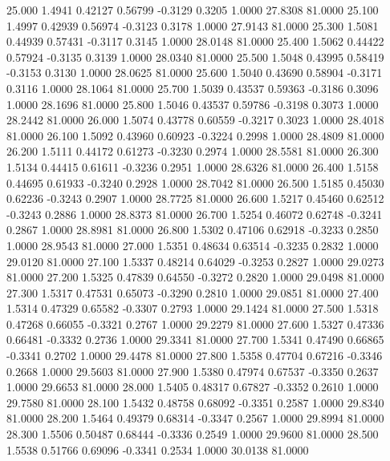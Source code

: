   25.000   1.4941   0.42127   0.56799  -0.3129   0.3205   1.0000  27.8308  81.0000
  25.100   1.4997   0.42939   0.56974  -0.3123   0.3178   1.0000  27.9143  81.0000
  25.300   1.5081   0.44939   0.57431  -0.3117   0.3145   1.0000  28.0148  81.0000
  25.400   1.5062   0.44422   0.57924  -0.3135   0.3139   1.0000  28.0340  81.0000
  25.500   1.5048   0.43995   0.58419  -0.3153   0.3130   1.0000  28.0625  81.0000
  25.600   1.5040   0.43690   0.58904  -0.3171   0.3116   1.0000  28.1064  81.0000
  25.700   1.5039   0.43537   0.59363  -0.3186   0.3096   1.0000  28.1696  81.0000
  25.800   1.5046   0.43537   0.59786  -0.3198   0.3073   1.0000  28.2442  81.0000
  26.000   1.5074   0.43778   0.60559  -0.3217   0.3023   1.0000  28.4018  81.0000
  26.100   1.5092   0.43960   0.60923  -0.3224   0.2998   1.0000  28.4809  81.0000
  26.200   1.5111   0.44172   0.61273  -0.3230   0.2974   1.0000  28.5581  81.0000
  26.300   1.5134   0.44415   0.61611  -0.3236   0.2951   1.0000  28.6326  81.0000
  26.400   1.5158   0.44695   0.61933  -0.3240   0.2928   1.0000  28.7042  81.0000
  26.500   1.5185   0.45030   0.62236  -0.3243   0.2907   1.0000  28.7725  81.0000
  26.600   1.5217   0.45460   0.62512  -0.3243   0.2886   1.0000  28.8373  81.0000
  26.700   1.5254   0.46072   0.62748  -0.3241   0.2867   1.0000  28.8981  81.0000
  26.800   1.5302   0.47106   0.62918  -0.3233   0.2850   1.0000  28.9543  81.0000
  27.000   1.5351   0.48634   0.63514  -0.3235   0.2832   1.0000  29.0120  81.0000
  27.100   1.5337   0.48214   0.64029  -0.3253   0.2827   1.0000  29.0273  81.0000
  27.200   1.5325   0.47839   0.64550  -0.3272   0.2820   1.0000  29.0498  81.0000
  27.300   1.5317   0.47531   0.65073  -0.3290   0.2810   1.0000  29.0851  81.0000
  27.400   1.5314   0.47329   0.65582  -0.3307   0.2793   1.0000  29.1424  81.0000
  27.500   1.5318   0.47268   0.66055  -0.3321   0.2767   1.0000  29.2279  81.0000
  27.600   1.5327   0.47336   0.66481  -0.3332   0.2736   1.0000  29.3341  81.0000
  27.700   1.5341   0.47490   0.66865  -0.3341   0.2702   1.0000  29.4478  81.0000
  27.800   1.5358   0.47704   0.67216  -0.3346   0.2668   1.0000  29.5603  81.0000
  27.900   1.5380   0.47974   0.67537  -0.3350   0.2637   1.0000  29.6653  81.0000
  28.000   1.5405   0.48317   0.67827  -0.3352   0.2610   1.0000  29.7580  81.0000
  28.100   1.5432   0.48758   0.68092  -0.3351   0.2587   1.0000  29.8340  81.0000
  28.200   1.5464   0.49379   0.68314  -0.3347   0.2567   1.0000  29.8994  81.0000
  28.300   1.5506   0.50487   0.68444  -0.3336   0.2549   1.0000  29.9600  81.0000
  28.500   1.5538   0.51766   0.69096  -0.3341   0.2534   1.0000  30.0138  81.0000
